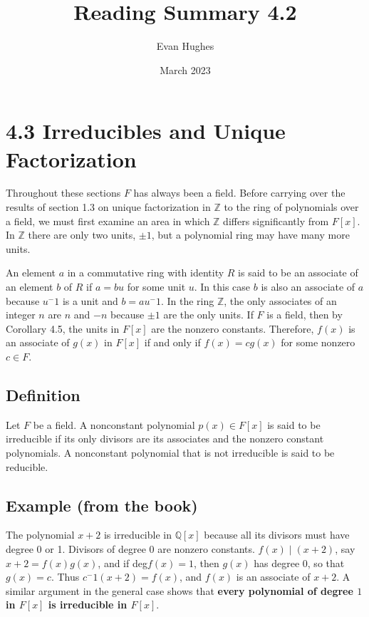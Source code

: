 \documentclass{article}
\title{Reading Summary 4.2}
\author{Evan Hughes}
\date{March 2023}
\begin{document}
\maketitle
\section*{4.3 Irreducibles and Unique Factorization}
Throughout these sections $F$ has always been a field. Before carrying over the results
of section 1.3 on unique factorization in $\mathbb{Z}$ to the ring of polynomials over a field,
we must first examine an area in which $\mathbb{Z}$ differs significantly from $F[x]$.
In $\mathbb{Z}$ there are only two units, $\pm 1$, but a polynomial ring may have
many more units.

An element $a$ in a commutative ring with identity $R$ is said to be an associate of an element $b$
of $R$ if $a=bu$ for some unit $u$. In this case $b$ is also an associate of $a$ because $u^-1$ is a unit and $b = au^-1$.
In the ring $\mathbb{Z}$, the only associates of an integer $n$ are $n$ and $-n$ because
$\pm 1$ are the only units. If $F$ is a field, then by Corollary 4.5, the units in $F[x]$ are the
nonzero constants. Therefore, $f(x)$ is an associate of $g(x)$ in $F[x]$ if and only if $f(x) = cg(x)$ for some nonzero $c\in F$.


\subsection*{Definition}

Let $F$ be a field. A nonconstant polynomial $p(x) \in F[x]$ is said
to be irreducible if its only divisors are its associates and the nonzero constant polynomials. A nonconstant polynomial
that is not irreducible is said to be reducible. 

\subsection*{Example (from the book)}

The polynomial $x+2$ is irreducible in $\mathbb{Q}[x]$ because
all its divisors must have degree 0 or 1. Divisors of degree 0 are nonzero constants.
$f(x)\mid (x+2)$, say $x+2 = f(x)g(x)$, and if deg$f(x)=1$, then $g(x)$ has degree $0$, so that $g(x) = c$.
Thus $c^-1(x+2) = f(x)$, and $f(x)$ is an associate of $x+2$.
A similar argument in the general case shows that \textbf{every polynomial of degree $1$ in $F[x]$ is irreducible in $F[x]$}.
\end{document}
